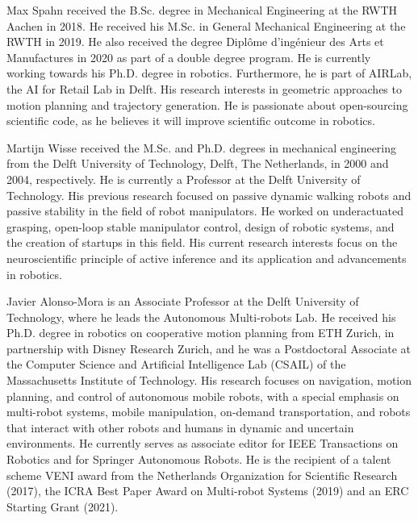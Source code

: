 \begin{IEEEbiography}
  {Max Spahn} received the B.Sc. degree in Mechanical Engineering at the RWTH
  Aachen in 2018. He received his M.Sc. in General Mechanical Engineering at
  the RWTH in 2019. He also received the degree 
  Diplôme d'ingénieur des Arts et Manufactures
  in 2020 as part of a double degree program.
 He is currently working towards his Ph.D. degree in robotics. Furthermore, he
  is part of AIRLab, the AI for Retail Lab in Delft. His research interests
  in geometric approaches to motion planning and trajectory generation. He is
  passionate about open-sourcing scientific code, as he believes it will improve
  scientific outcome in robotics.
\end{IEEEbiography}
\vspace{-15mm}
\begin{IEEEbiography}{Martijn Wisse}
  received the M.Sc. and Ph.D. degrees in mechanical engineering from the Delft
  University of Technology, Delft, The Netherlands, in 2000 and 2004,
  respectively. He is currently a Professor at the Delft University of Technology.
  His previous research focused on passive dynamic walking robots and passive
  stability in the field of robot manipulators. He worked on underactuated
  grasping, open-loop stable manipulator control, design of robotic systems, and
  the creation of startups in this field. His current research interests focus on
  the neuroscientific principle of active inference and its application and
  advancements in robotics. 
\end{IEEEbiography}
\vspace{-15mm}
\begin{IEEEbiography}{Javier Alonso-Mora}
  is an Associate Professor at the Delft University of
  Technology, where he leads the Autonomous Multi-robots Lab. He received his
  Ph.D. degree in robotics on cooperative motion planning
  from ETH Zurich, in partnership with Disney Research
  Zurich, and he was a Postdoctoral Associate at the Computer Science and
  Artificial Intelligence Lab (CSAIL) of the Massachusetts Institute of
  Technology. His research focuses on navigation, motion planning, and control of
  autonomous mobile robots, with a special emphasis on multi-robot systems, mobile
  manipulation, on-demand transportation, and robots that interact with other
  robots and humans in dynamic and uncertain environments. He currently serves as
  associate editor for IEEE Transactions on Robotics and for Springer Autonomous
  Robots. He is the recipient of a talent scheme VENI award from the Netherlands
  Organization for Scientific Research (2017), the ICRA Best Paper Award on
  Multi-robot Systems (2019) and an ERC Starting Grant (2021).
\end{IEEEbiography}
\vspace{27em}

